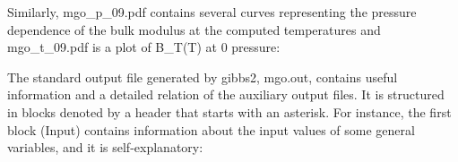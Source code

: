 \documentclass[a4paper]{article}
\begin{document}
Similarly, mgo\_p\_09.pdf contains several curves representing the
pressure dependence of the bulk modulus at the computed temperatures
and mgo\_t\_09.pdf is a plot of B\_T(T) at 0 pressure:

\noindent{}

\noindent{}

The standard output file generated by gibbs2, mgo.out, contains useful
information and a detailed relation of the auxiliary output files. It
is structured in blocks denoted by a header that starts with an
asterisk. For instance, the first block (Input) contains information
about the input values of some general variables, and it is
self-explanatory:
\end{document}
